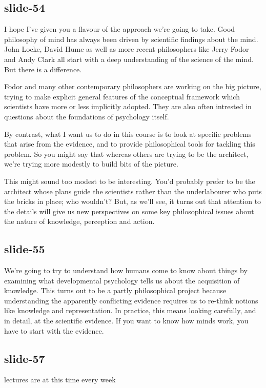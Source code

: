 \documentclass[12pt,\papersize]{extarticle}
\begin{document}
\subsection{slide-54}
I hope I've given you a flavour of the approach we're going to take.
Good philosophy of mind has always been driven by scientific findings about the mind.
John Locke, David Hume as well as more recent philosophers like Jerry Fodor and Andy Clark all
start with a deep understanding of the science of the mind.
But there is a difference.

Fodor and many other contemporary philosophers are working on the big picture, trying to make
explicit general features of the conceptual framework which scientists have more or less
implicitly adopted.
They are also often intrested in questions about the foundations of psychology itself.

By contrast, what I want us to do in this course is to look at specific problems that arise
from the evidence,
and to provide philosophical tools for tackling this problem.
So you might say that whereas others are trying to be the architect, we're trying more
modestly to build bits of the picture.

This might sound too modest to be interesting.
You'd probably prefer to be the architect whose plans guide the scientists rather than the
underlabourer who puts the bricks in place; who wouldn't?
But, as we'll see, it turns out that attention to the details will give us new perspectives on
some key philosophical issues about the nature of knowledge, perception and action.

\subsection{slide-55}
We're going to try to understand how humans come to know about things by examining what
developmental psychology tells us about the acquisition of knowledge.
This turns out to be a partly philosophical project because understanding the apparently
conflicting evidence requires us to re-think notions like knowledge and representation.
In practice, this means looking carefully, and in detail, at the scientific evidence.
If you want to know how minds work, you have to start with the evidence.

\subsection{slide-57}
lectures are at this time every week
\end{document}
